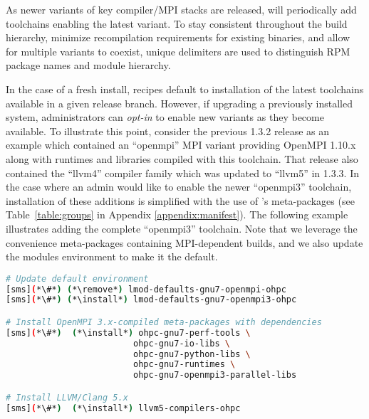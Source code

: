 As newer variants of key compiler/MPI stacks are released, \OHPC{} will
periodically add toolchains enabling the latest variant. To stay consistent
throughout the build hierarchy, minimize recompilation requirements for existing
binaries, and allow for multiple variants to coexist, unique delimiters are
used to distinguish RPM package names and module hierarchy.

In the case of a fresh install, \OHPC{} recipes default to installation of the
latest toolchains available in a given release branch. However, if upgrading a
previously installed system, administrators can {\em opt-in} to enable new
variants as they become available. To illustrate this point, consider the
previous \OHPC{} 1.3.2 release as an example which contained an {``openmpi''}
MPI variant providing OpenMPI 1.10.x along with runtimes and libraries compiled
with this toolchain. That release also contained the {``llvm4''} compiler
family which was updated to {``llvm5''} in \OHPC{} 1.3.3.  In the case
where an admin would like to enable the newer {``openmpi3''} toolchain,
installation of these additions is simplified with the use of \OHPC{}'s
meta-packages (see Table~\ref{table:groups} in Appendix
\ref{appendix:manifest}).  The following example illustrates adding the
complete ``openmpi3'' toolchain.  Note that we leverage the convenience
meta-packages containing MPI-dependent builds, and we also update the
modules environment to make it the default.

\begin{lstlisting}[language=bash,keywords={}]
# Update default environment
[sms](*\#*) (*\remove*) lmod-defaults-gnu7-openmpi-ohpc
[sms](*\#*) (*\install*) lmod-defaults-gnu7-openmpi3-ohpc

# Install OpenMPI 3.x-compiled meta-packages with dependencies
[sms](*\#*)  (*\install*) ohpc-gnu7-perf-tools \
                         ohpc-gnu7-io-libs \
                         ohpc-gnu7-python-libs \
                         ohpc-gnu7-runtimes \
                         ohpc-gnu7-openmpi3-parallel-libs

# Install LLVM/Clang 5.x
[sms](*\#*)  (*\install*) llvm5-compilers-ohpc
\end{lstlisting}

